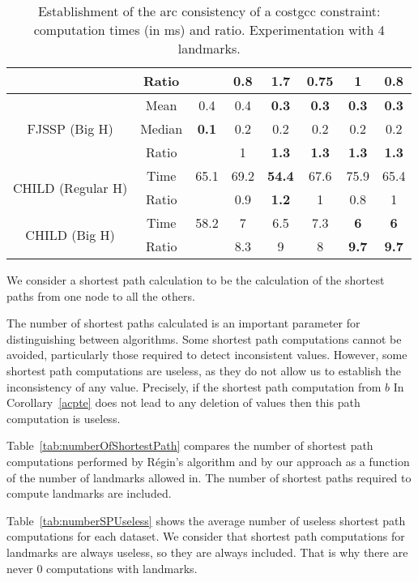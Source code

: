 \begin{table}[!ht]
{\begin{tabular}{| c | c || c | c | c | c | c | c |}
               & Ratio & & 0.8 & \textbf{1.7} & 0.75 & 1 & 0.8 \\
         \hline
         \multirow{3}{2.1cm}{FJSSP (Big H)} 
               & Mean & 0.4 & 0.4 & \textbf{0.3} & \textbf{0.3} & \textbf{0.3} & \textbf{0.3} \\
               & Median & \textbf{0.1} & 0.2 & 0.2 & 0.2 & 0.2 & 0.2 \\
               & Ratio & & 1 & \textbf{1.3} & \textbf{1.3} & \textbf{1.3} & \textbf{1.3} \\
         \hline
         \multirow{2}{2.1cm}{CHILD (Regular H)} 
               & Time & 65.1 & 69.2 & \textbf{54.4} & 67.6 & 75.9 & 65.4 \\
               & Ratio & & 0.9 & \textbf{1.2} & 1 & 0.8 & 1 \\
         \hline
         \multirow{2}{2.1cm}{CHILD (Big H)} 
               & Time & 58.2 & 7 & 6.5 & 7.3 & \textbf{6} & \textbf{6} \\
               & Ratio & & 8.3 & 9 & 8 & \textbf{9.7} & \textbf{9.7} \\
         \hline
    \end{tabular}
    }
    \caption{Establishment of the arc consistency of a costgcc constraint: computation times (in ms) and ratio. Experimentation with 4 landmarks.}
    \label{tab:timeWithMagic}
\end{table}

We consider a shortest path calculation to be the calculation of the shortest paths from one node to all the others. 

The number of shortest paths calculated is an important parameter for distinguishing between algorithms. 
Some shortest path computations cannot be avoided, particularly those required to detect inconsistent values. 
However, some shortest path computations are useless, as they do not allow us to establish the inconsistency of any value. Precisely, if the shortest path computation from $b$ In Corollary~\ref{acpte} does not lead to any deletion of values then this path computation is useless. 

Table~\ref{tab:numberOfShortestPath} compares the number of shortest path computations performed by Régin's algorithm and by our approach as a function of the number of landmarks allowed in. The number of shortest paths required to compute landmarks are included.

Table~\ref{tab:numberSPUseless} shows the average number of useless shortest path computations for each dataset. We consider that shortest path computations for landmarks are always useless, so they are always included. That is why there are never $0$ computations with landmarks. 

